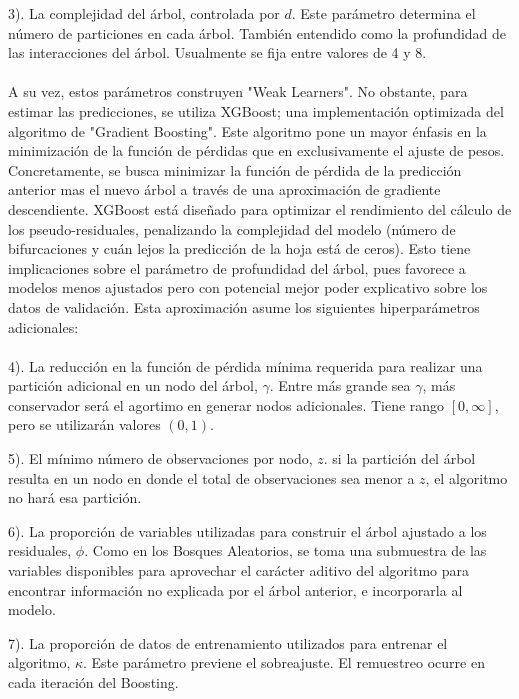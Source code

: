 \documentclass[article,11 pt]{article}
\begin{document}
3). La complejidad del árbol, controlada por $d$. Este parámetro determina el número de particiones en cada árbol. También entendido como la profundidad de las interacciones del árbol. Usualmente se fija entre valores de 4 y 8.
\\
\\
A su vez, estos parámetros construyen "Weak Learners". No obstante, para estimar las predicciones, se utiliza XGBoost; una implementación optimizada del algoritmo de "Gradient Boosting". Este algoritmo pone un mayor énfasis en la minimización de la función de pérdidas que en exclusivamente el ajuste de pesos. Concretamente, se busca minimizar la función de pérdida de la predicción anterior mas el nuevo árbol a través de una aproximación de gradiente descendiente. XGBoost está diseñado para optimizar el rendimiento del cálculo de los pseudo-residuales, penalizando la complejidad del modelo (número de bifurcaciones y cuán lejos la predicción de la hoja está de ceros). Esto tiene implicaciones sobre el parámetro de profundidad del árbol, pues favorece a modelos menos ajustados pero con potencial mejor poder explicativo sobre los datos de validación. Esta aproximación asume los siguientes hiperparámetros adicionales:
\\
\\
4). La reducción en la función de pérdida mínima requerida para realizar una partición adicional en un nodo del árbol, $\gamma$. Entre más grande sea $\gamma$, más conservador será el agortimo en generar nodos adicionales. Tiene rango $[0,\infty]$, pero se utilizarán valores $(0,1)$.

5). El mínimo número de observaciones por nodo, $z$. si la partición del árbol resulta en un nodo en donde el total de observaciones sea menor a $z$, el algoritmo no hará esa partición. 

6). La proporción de variables utilizadas para construir el árbol ajustado a los residuales, $\phi$. Como en los Bosques Aleatorios, se toma una submuestra de las variables disponibles para aprovechar el carácter aditivo del algoritmo para encontrar información no explicada por el árbol anterior, e incorporarla al modelo.

7). La proporción de datos de entrenamiento utilizados para entrenar el algoritmo, $\kappa$. Este parámetro previene el sobreajuste. El remuestreo ocurre en cada iteración del Boosting.
\end{document}
